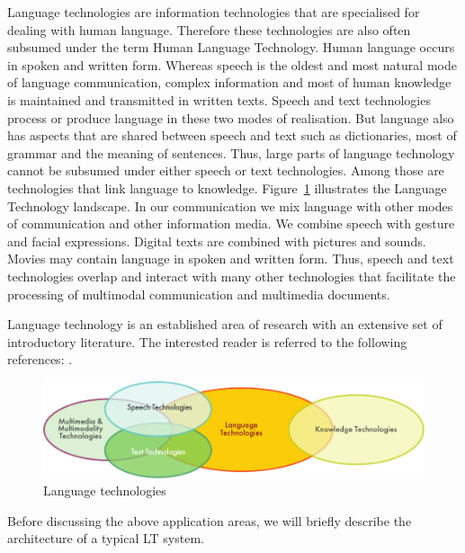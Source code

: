 \begin{multicols}{2}

Language technologies are information technologies that are specialised for dealing with human language. Therefore these technologies are also often subsumed under the term Human Language Technology. Human language occurs in spoken and written form. Whereas speech is the oldest and most natural mode of language communication, complex information and most of human knowledge is maintained and transmitted in written texts. Speech and text technologies process or produce language in these two modes of realisation. But language also has aspects that are shared between speech and text such as dictionaries, most of grammar and the meaning of sentences. Thus, large parts of language technology cannot be subsumed under either speech or text technologies. Among those are technologies that link language to knowledge. Figure~\ref{fig:ltincontext_en}  illustrates the Language Technology landscape. In our communication we mix language with other modes of communication and other information media. We combine speech with gesture and facial expressions. Digital texts are combined with pictures and sounds. Movies may contain language in spoken and written form. Thus, speech and text technologies overlap and interact with many other technologies that facilitate the processing of multimodal communication and multimedia documents.

Language technology is an established area of research with an extensive set of introductory literature. The interested reader is referred to the following references: \cite{carstensen-etal1, jurafsky-martin01, manning-schuetze1, lt-world1, lt-survey1}.

\begin{figure}[htb]
  \center
  \includegraphics[width=\textwidth]{../_media/english/language_technologies}
  \caption{Language technologies}
  \label{fig:ltincontext_en}
\end{figure}

Before discussing the above application areas, we will briefly describe the architecture of a typical LT system.


\end{multicols}
